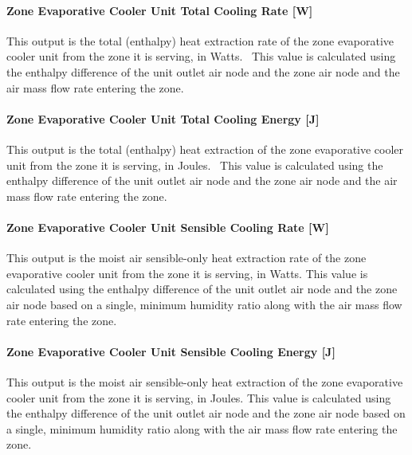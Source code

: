 \paragraph{Zone Evaporative Cooler Unit Total Cooling Rate {[}W{]}}\label{zone-evaporative-cooler-unit-total-cooling-rate-w}

This output is the total (enthalpy) heat extraction rate of the zone evaporative cooler unit from the zone it is serving, in Watts.~ This value is calculated using the enthalpy difference of the unit outlet air node and the zone air node and the air mass flow rate entering the zone.

\paragraph{Zone Evaporative Cooler Unit Total Cooling Energy {[}J{]}}\label{zone-evaporative-cooler-unit-total-cooling-energy-j}

This output is the total (enthalpy) heat extraction of the zone evaporative cooler unit from the zone it is serving, in Joules.~ This value is calculated using the enthalpy difference of the unit outlet air node and the zone air node and the air mass flow rate entering the zone.

\paragraph{Zone Evaporative Cooler Unit Sensible Cooling Rate {[}W{]}}\label{zone-evaporative-cooler-unit-sensible-cooling-rate-w}

This output is the moist air sensible-only heat extraction rate of the zone evaporative cooler unit from the zone it is serving, in Watts. This value is calculated using the enthalpy difference of the unit outlet air node and the zone air node based on a single, minimum humidity ratio along with the air mass flow rate entering the zone.

\paragraph{Zone Evaporative Cooler Unit Sensible Cooling Energy {[}J{]}}\label{zone-evaporative-cooler-unit-sensible-cooling-energy-j}

This output is the moist air sensible-only heat extraction of the zone evaporative cooler unit from the zone it is serving, in Joules. This value is calculated using the enthalpy difference of the unit outlet air node and the zone air node based on a single, minimum humidity ratio along with the air mass flow rate entering the zone.

